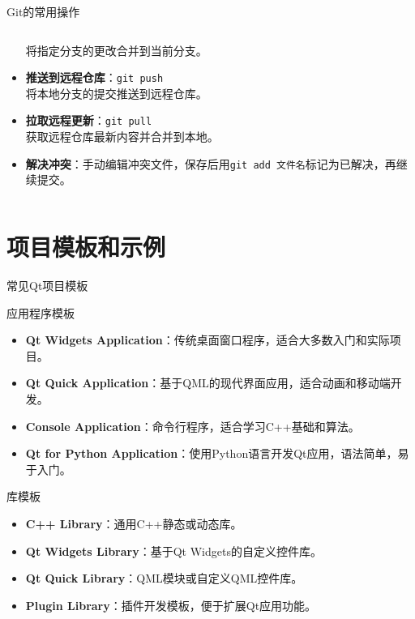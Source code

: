 \documentclass[UTF8,aspectratio=169]{beamer}
\begin{document}
\begin{frame}{Git的常用操作}
\begin{columns}
\begin{column}{0.48\textwidth}
\begin{itemize}
                    将指定分支的更改合并到当前分支。
                \item \textbf{推送到远程仓库}：\texttt{git push} \\
                    将本地分支的提交推送到远程仓库。
                \item \textbf{拉取远程更新}：\texttt{git pull} \\
                    获取远程仓库最新内容并合并到本地。
                \item \textbf{解决冲突}：手动编辑冲突文件，保存后用\texttt{git add 文件名}标记为已解决，再继续提交。
            \end{itemize}
        \end{column}
    \end{columns}
\end{frame}

\section{项目模板和示例}

\begin{frame}{常见Qt项目模板}
    \begin{ytublock}{应用程序模板}
        \begin{itemize}
            \item \textbf{Qt Widgets Application}：传统桌面窗口程序，适合大多数入门和实际项目。
            \item \textbf{Qt Quick Application}：基于QML的现代界面应用，适合动画和移动端开发。
            \item \textbf{Console Application}：命令行程序，适合学习C++基础和算法。
            \item \textbf{Qt for Python Application}：使用Python语言开发Qt应用，语法简单，易于入门。
        \end{itemize}
    \end{ytublock}
    \begin{ytublock}{库模板}
        \begin{itemize}
            \item \textbf{C++ Library}：通用C++静态或动态库。
            \item \textbf{Qt Widgets Library}：基于Qt Widgets的自定义控件库。
            \item \textbf{Qt Quick Library}：QML模块或自定义QML控件库。
            \item \textbf{Plugin Library}：插件开发模板，便于扩展Qt应用功能。
        \end{itemize}
    \end{ytublock}
\end{frame}
\end{document}
